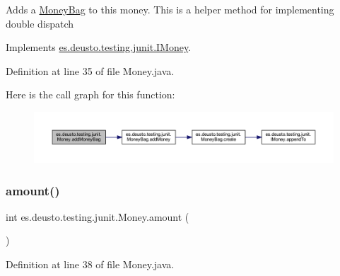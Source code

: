 Adds a \mbox{\hyperlink{classes_1_1deusto_1_1testing_1_1junit_1_1_money_bag}{Money\+Bag}} to this money. This is a helper method for implementing double dispatch 

Implements \mbox{\hyperlink{interfacees_1_1deusto_1_1testing_1_1junit_1_1_i_money_ac47c8940f0565bd9eda16730170bc9f7}{es.\+deusto.\+testing.\+junit.\+I\+Money}}.



Definition at line 35 of file Money.\+java.

Here is the call graph for this function\+:
\nopagebreak
\begin{figure}[H]
\begin{center}
\leavevmode
\includegraphics[width=350pt]{classes_1_1deusto_1_1testing_1_1junit_1_1_money_ad9a107a6884026a1bb12102d3a8a5b41_cgraph}
\end{center}
\end{figure}
\mbox{\label{classes_1_1deusto_1_1testing_1_1junit_1_1_money_a9bef5d9027f270e8ce0303e4f929bbd5}} 
\subsubsection{\texorpdfstring{amount()}{amount()}}
{\footnotesize\ttfamily int es.\+deusto.\+testing.\+junit.\+Money.\+amount (\begin{DoxyParamCaption}{ }\end{DoxyParamCaption})}



Definition at line 38 of file Money.\+java.

